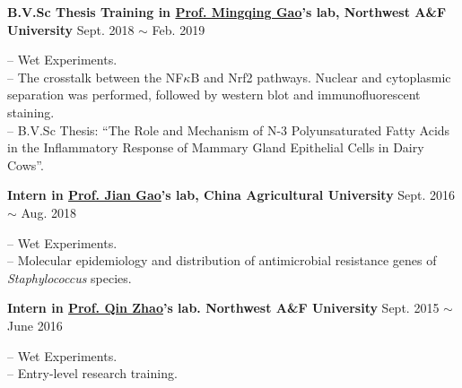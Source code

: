 \textbf{B.V.Sc Thesis Training in \href{https://faculty.nwu.edu.cn/gaomingqing/en/index.htm}{Prof. Mingqing Gao}'s lab, Northwest A\&F University} \hfill Sept. 2018 $\sim$ Feb. 2019

-- Wet Experiments.\\
-- The crosstalk between the NF$\kappa$B and Nrf2 pathways. Nuclear and cytoplasmic separation was performed, followed by western blot and immunofluorescent staining.\\
-- B.V.Sc Thesis: ``The Role and Mechanism of N-3 Polyunsaturated Fatty Acids in the Inflammatory Response of Mammary Gland Epithelial Cells in Dairy Cows''.


\vspace{5pt}


\textbf{Intern in \href{https://cvm.cau.edu.cn/art/2017/9/12/art_41957_71.html}{Prof. Jian Gao}'s lab, China Agricultural University} \hfill Sept. 2016 $\sim$ Aug. 2018

-- Wet Experiments.\\
-- Molecular epidemiology and distribution of antimicrobial resistance genes of \textit{Staphylococcus} species\cite{qu2019molecular}.

\vspace{5pt}

\textbf{Intern in \href{https://dyxy.nwsuaf.edu.cn/en/People/FullProfessor/5e6012bf013a499c946289472b285795.htm}{Prof. Qin Zhao}'s lab. Northwest A\&F University} \hfill Sept. 2015 $\sim$ June 2016

-- Wet Experiments.\\
-- Entry-level research training.